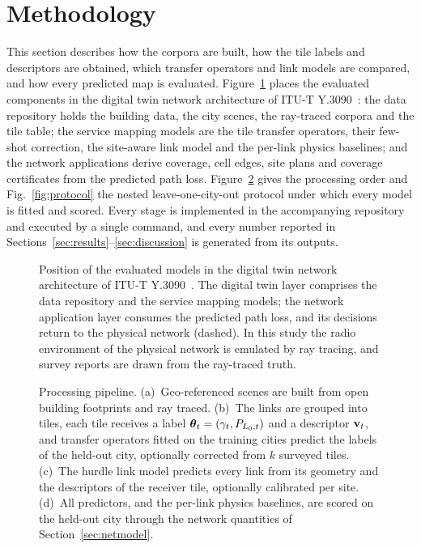 \section{Methodology}
\label{sec:methods}

This section describes how the corpora are built, how the tile labels and
descriptors are obtained, which transfer operators and link models are
compared, and how every predicted map is evaluated. Figure~\ref{fig:architecture}
places the evaluated components in the digital twin network architecture
of ITU-T Y.3090~\cite{ituy3090}: the data repository holds the building
data, the city scenes, the ray-traced corpora and the tile table; the
service mapping models are the tile transfer operators, their few-shot
correction, the site-aware link model and the per-link physics baselines;
and the network applications derive coverage, cell edges, site plans and
coverage certificates from the predicted path loss. Figure~\ref{fig:pipeline}
gives the processing order and Fig.~\ref{fig:protocol} the nested
leave-one-city-out protocol under which every model is fitted and scored.
Every stage is implemented in the accompanying repository and executed by a
single command, and every number reported in
Sections~\ref{sec:results}--\ref{sec:discussion} is generated from its
outputs.

\begin{figure}[!tp]
\centering
%
\caption{Position of the evaluated models in the digital twin network
architecture of ITU-T Y.3090~\cite{ituy3090}. The digital twin layer
comprises the data repository and the service mapping models; the network
application layer consumes the predicted path loss, and its decisions
return to the physical network (dashed). In this study the radio
environment of the physical network is emulated by ray tracing, and survey
reports are drawn from the ray-traced truth.}
\label{fig:architecture}
\end{figure}

\begin{figure}[!tp]
\centering
%
\caption{Processing pipeline. (a)~Geo-referenced scenes are built from
open building footprints and ray traced. (b)~The links are grouped into
tiles, each tile receives a label $\boldsymbol{\theta}_t=(\gamma_t,P_{L_0,t})$ and a
descriptor $\mathbf{v}_t$, and transfer operators fitted on the training cities
predict the labels of the held-out city, optionally corrected from $k$
surveyed tiles. (c)~The hurdle link model predicts every link from its
geometry and the descriptors of the receiver tile, optionally calibrated per
site. (d)~All predictors, and the per-link physics baselines, are scored on
the held-out city through the network quantities of
Section~\ref{sec:netmodel}.}
\label{fig:pipeline}
\end{figure}

